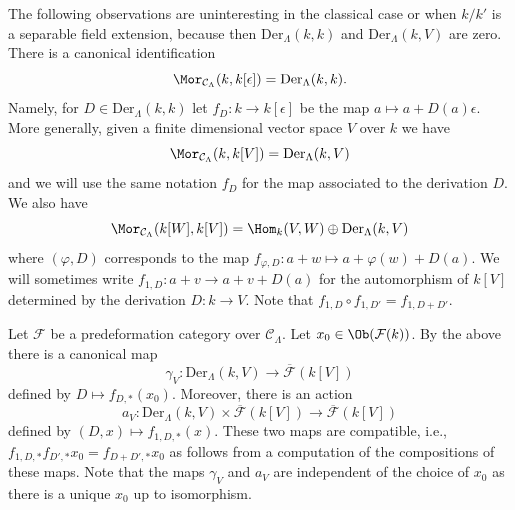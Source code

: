 \noindent
The following observations are uninteresting in the classical case or when
$k/k'$ is a separable field extension, because then
$\text{Der}_\Lambda(k, k)$ and $\text{Der}_\Lambda(k, V)$ are zero.
There is a canonical identification
$$
\Mor_{\mathcal{C}_\Lambda}(k, k[\epsilon]) =
\text{Der}_\Lambda(k, k).
$$
Namely, for $D \in \text{Der}_\Lambda(k, k)$ let $f_D : k \to k[\epsilon]$
be the map $a \mapsto a + D(a)\epsilon$. More generally, given a finite
dimensional vector space $V$ over $k$ we have
$$
\Mor_{\mathcal{C}_\Lambda}(k, k[V]) =
\text{Der}_\Lambda(k, V)
$$
and we will use the same notation $f_D$ for the map associated to the
derivation $D$. We also have
$$
\Mor_{\mathcal{C}_\Lambda}(k[W], k[V]) =
\Hom_k(V, W) \oplus \text{Der}_\Lambda(k, V)
$$
where $(\varphi, D)$ corresponds to the map
$f_{\varphi, D} : a + w \mapsto a + \varphi(w) + D(a)$. We will sometimes write
$f_{1, D} : a + v \to a + v + D(a)$ for the automorphism
of $k[V]$ determined by the derivation $D : k \to V$. Note that
$f_{1, D} \circ f_{1, D'} = f_{1, D + D'}$.

\medskip\noindent
Let $\mathcal{F}$ be a predeformation category over $\mathcal{C}_\Lambda$.
Let $x_0 \in \Ob(\mathcal{F}(k))$. By the above there is a canonical
map
$$
\gamma_V :
\text{Der}_\Lambda(k, V)
\longrightarrow
\overline{\mathcal{F}}(k[V])
$$
defined by $D \mapsto f_{D, *}(x_0)$. Moreover, there is an action
$$
a_V : \text{Der}_\Lambda(k, V) \times \overline{\mathcal{F}}(k[V])
\longrightarrow
\overline{\mathcal{F}}(k[V])
$$
defined by $(D, x) \mapsto f_{1, D, *}(x)$. These two maps are compatible,
i.e., $f_{1, D, *}f_{D', *}x_0 = f_{D + D', *}x_0$ as follows from a
computation of the compositions of these maps. Note that the maps
$\gamma_V$ and $a_V$ are independent of the choice of $x_0$ as there
is a unique $x_0$ up to isomorphism.
